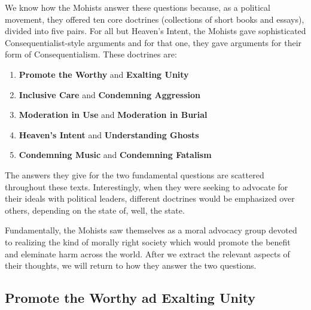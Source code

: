 We know how the Mohists answer these questions because, as a political movement, they offered ten core doctrines (collections of short books and essays), divided into five pairs. For all but Heaven's Intent, the Mohists gave sophisticated Consequentialist-style arguments and for that one, they gave arguments for their form of Consequentialism. These doctrines are:

\begin{enumerate}
\item \textbf{Promote the Worthy} and \textbf{Exalting Unity}
\item \textbf{Inclusive Care} and \textbf{Condemning Aggression}
\item \textbf{Moderation in Use} and \textbf{Moderation in Burial}
\item \textbf{Heaven's Intent} and \textbf{Understanding Ghosts}
\item \textbf{Condemning Music} and \textbf{Condemning Fatalism}
\end{enumerate}

The answers they give for the two fundamental questions are scattered throughout these texts. Interestingly, when they were seeking to advocate for their ideals with political leaders, different doctrines would be emphasized over others, depending on the state of, well, the state. 


Fundamentally, the Mohists saw themselves as a moral advocacy group devoted to realizing the kind of morally right society which would promote the benefit and eleminate harm across the world. After we extract the relevant aspects of their thoughts, we will return to how they answer the two questions. 

\subsection{Promote the Worthy ad Exalting Unity}

